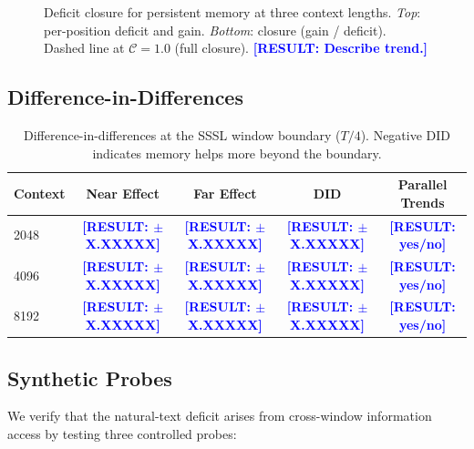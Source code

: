 \documentclass[11pt]{article}
\newcommand{\result}[1]{\textcolor{blue}{\textbf{[RESULT: #1]}}}
\newcommand{\closure}{\mathcal{C}}
\begin{document}
\begin{figure}[h]
\centering
{}
\caption{Deficit closure for persistent memory at three context lengths.
  \textit{Top}: per-position deficit and gain.
  \textit{Bottom}: closure (gain / deficit). Dashed line at
  $\closure = 1.0$ (full closure).
  \result{Describe trend.}}
\label{fig:closure}
\end{figure}

\subsection{Difference-in-Differences}

\begin{table}[h]
\centering
\caption{Difference-in-differences at the SSSL window boundary ($T/4$).
Negative DID indicates memory helps more beyond the boundary.}
\label{tab:did}
\begin{tabular}{lcccc}
\toprule
Context & Near Effect & Far Effect & DID & Parallel Trends \\
\midrule
2048 & \result{$\pm$X.XXXXX} & \result{$\pm$X.XXXXX} & \result{$\pm$X.XXXXX} & \result{yes/no} \\
4096 & \result{$\pm$X.XXXXX} & \result{$\pm$X.XXXXX} & \result{$\pm$X.XXXXX} & \result{yes/no} \\
8192 & \result{$\pm$X.XXXXX} & \result{$\pm$X.XXXXX} & \result{$\pm$X.XXXXX} & \result{yes/no} \\
\bottomrule
\end{tabular}
\end{table}

\subsection{Synthetic Probes}

We verify that the natural-text deficit arises from cross-window
information access by testing three controlled probes:
\end{document}
